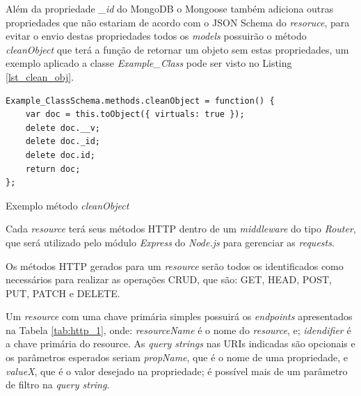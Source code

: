 Além da propriedade \textit{\_id} do MongoDB o Mongoose também adiciona outras propriedades que não estariam de acordo com o JSON Schema do \textit{resoruce}, para evitar o envio destas propriedades todos os \textit{models} possuirão o método \textit{cleanObject} que terá a função de retornar um objeto sem estas propriedades, um exemplo aplicado a classe \textit{Example\_Class} pode ser visto no Listing \ref{lst_clean_obj}.

\begin{listing}
\begin{verbatim}               
Example_ClassSchema.methods.cleanObject = function() {
    var doc = this.toObject({ virtuals: true });
    delete doc.__v;
    delete doc._id;
    delete doc.id;
    return doc;
};
\end{verbatim}
\caption{Exemplo método \textit{cleanObject}}
\label{lst_clean_obj}
\end{listing}

\label{sec:bnf:http}

Cada \textit{resource} terá seus métodos HTTP dentro de um \textit{middleware} do tipo \textit{Router}, que será utilizado pelo módulo \textit{Express} do \textit{Node.js} para gerenciar as \textit{requests}. 

Os métodos HTTP gerados para um \textit{resource} serão todos os identificados como necessários para realizar as operações CRUD, que são: GET, HEAD, POST, PUT, PATCH e DELETE.

Um \textit{resource} com uma chave primária simples possuirá os \textit{endpoints} apresentados na Tabela \ref{tab:http_1}, onde: \textit{resourceName} é o nome do \textit{resource}, e; \textit{idendifier} é a chave primária do resource. As \textit{query strings} nas URIs indicadas são opcionais e os parâmetros esperados seriam \textit{propName}, que é o nome de uma propriedade, e \textit{valueX}, que é o valor desejado na propriedade; é possível mais de um parâmetro de filtro na \textit{query string}.

